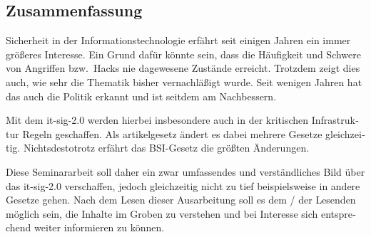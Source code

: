 \begin{otherlanguage}{ngerman}
	\chapter*{Zusammenfassung}
%
	Sicherheit in der Informationstechnologie erfährt seit einigen Jahren ein immer größeres Interesse.
	Ein Grund dafür könnte sein, dass die Häufigkeit und Schwere von Angriffen bzw.\ Hacks nie dagewesene Zustände erreicht.
	Trotzdem zeigt dies auch, wie sehr die Thematik bisher vernachläßigt wurde.
	Seit wenigen Jahren hat das auch die Politik erkannt und ist seitdem am Nachbessern.

	Mit dem \acrlong{it-sig-2.0} werden hierbei insbesondere auch in der kritischen Infrastruktur Regeln geschaffen.
	Als \gls{artikelgesetz} ändert es dabei mehrere Gesetze gleichzeitig.
	Nichtsdestotrotz erfährt das BSI-Gesetz die größten Änderungen.

	Diese Seminararbeit soll daher ein zwar umfassendes und verständliches Bild über das \acrshort{it-sig-2.0} verschaffen,
	jedoch gleichzeitig nicht zu tief beispielsweise in andere Gesetze gehen.
	Nach dem Lesen dieser Ausarbeitung soll es dem / der Lesenden möglich sein,
	die Inhalte im Groben zu verstehen und bei Interesse sich entsprechend weiter informieren zu können.
\end{otherlanguage}
